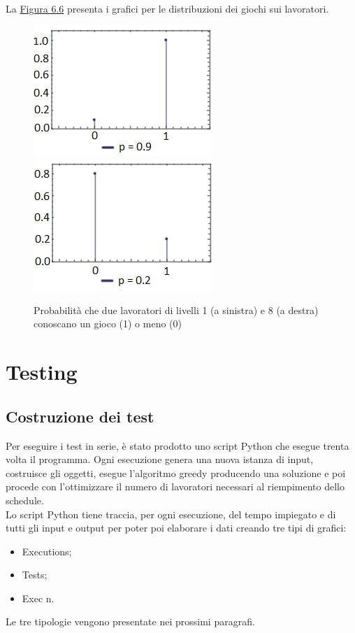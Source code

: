      La \hyperref[fig66]{Figura 6.6} presenta i grafici per le distribuzioni dei giochi sui lavoratori.
     \begin{figure}[!htb]
         \label{fig66}
         \begin{widepage}
             \centering
             \includegraphics[width=.49\textwidth]{../immagini/livello_1.png}\hfil
             \includegraphics[width=.49\textwidth]{../immagini/livello_8.png}
             \caption{Probabilità che due lavoratori di livelli 1 (a sinistra) e 8 (a destra) conoscano un gioco (1) o meno (0)}
         \end{widepage}
     \end{figure}
 \clearpage
\section{Testing}
\subsection{Costruzione dei test}
Per eseguire i test in serie, è stato prodotto uno script Python che esegue trenta volta il programma. Ogni esecuzione genera una nuova istanza di input, costruisce gli oggetti, esegue l'algoritmo greedy producendo una soluzione e poi procede con l'ottimizzare il numero di lavoratori necessari al riempimento dello schedule.\\ Lo script Python tiene traccia, per ogni esecuzione, del tempo impiegato e di tutti gli input e output per poter poi elaborare i dati creando tre tipi di grafici:
\begin{itemize}
    \item Executions;
    \item Tests;
    \item Exec n.
\end{itemize}
\noindent
Le tre tipologie vengono presentate nei prossimi paragrafi.

